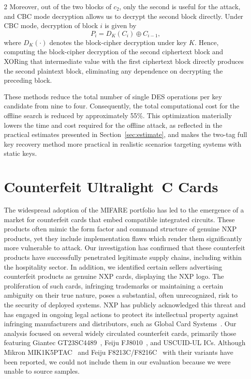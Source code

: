 \documentclass[10pt,letterpaper]{article}
\begin{document}
\begin{multicols}{2}
Moreover, out of the two blocks of $c_2$, only the second is useful for the attack, and CBC mode decryption allows us to decrypt the second block directly. Under CBC mode, decryption of block \(i\) is given by
\[
P_i = D_K(C_i) \oplus C_{i-1},
\]
where \(D_K(\cdot)\) denotes the block-cipher decryption under key \(K\). Hence, computing the block-cipher decryption of the second ciphertext block and XORing that intermediate value with the first ciphertext block directly produces the second plaintext block, eliminating any dependence on decrypting the preceding block.

These methods reduce the total number of single DES operations per key candidate from nine to four. Consequently, the total computational cost for the offline search is reduced by approximately 55\%. This optimization materially lowers the time and cost required for the offline attack, as reflected in the practical estimates presented in Section~\ref{sec:estimate}, and makes the two-tag full key recovery method more practical in realistic scenarios targeting systems with static keys.

\section{Counterfeit Ultralight~C Cards}
\label{sec:counterfeit}
The widespread adoption of the MIFARE portfolio has led to the emergence of a market for counterfeit cards that embed compatible integrated circuits. These products often mimic the form factor and command structure of genuine NXP products, yet they include implementation flaws which render them significantly more vulnerable to attack. Our investigation has confirmed that these counterfeit products have successfully penetrated legitimate supply chains, including within the hospitality sector. In addition, we identified certain sellers advertising counterfeit products as genuine NXP cards, displaying the NXP logo. The proliferation of such cards, infringing trademarks or maintaining a certain ambiguity on their true nature, poses a substantial, often unrecognized, risk to the security of deployed systems. NXP has publicly acknowledged this threat and has engaged in ongoing legal actions to protect its intellectual property against infringing manufacturers and distributors, such as Global Card Systems~\cite{nxp_mifare_anticounterfeit}. Our analysis focused on several widely circulated counterfeit cards, primarily those featuring Giantec GT23SC4489~\cite{ulcg_datasheet}, Feiju FJ8010~\cite{fj8010}, and USCUID-UL ICs. Although Mikron MIK1K5PTAC~\cite{mik1k5ptac} and Feiju F8213C/F8216C~\cite{f8216c} with their variants have been reported, we could not include them in our evaluation because we were unable to source samples.


\end{multicols}
\end{document}
